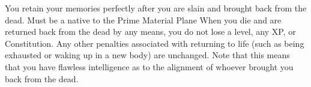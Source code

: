 {}
\shortdescfeat
{You retain your memories perfectly after you are slain and brought back from the dead.}
{Must be a native to the Prime Material Plane}
{When you die and are returned back from the dead by any means, you do not lose a level, any XP, or Constitution. Any other penalties associated with returning to life (such as being exhausted or waking up in a new body) are unchanged. Note that this means that you have flawless intelligence as to the alignment of whoever brought you back from the dead.}